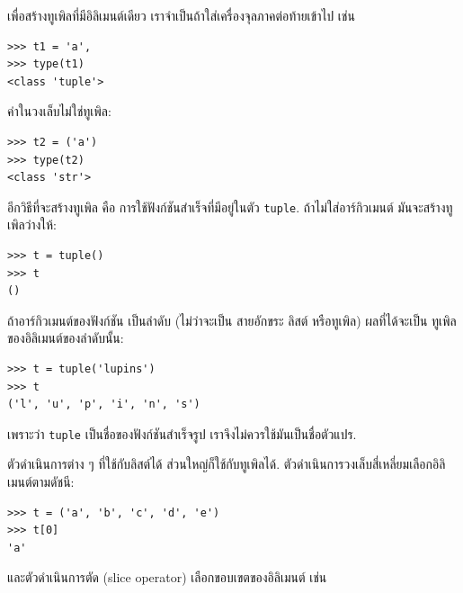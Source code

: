 เพื่อสร้างทูเพิลที่มีอิลิเมนต์เดียว เราจำเป็นถ้าใส่เครื่องจุลภาคต่อท้ายเข้าไป
เช่น

\begin{verbatim}
>>> t1 = 'a',
>>> type(t1)
<class 'tuple'>
\end{verbatim}
%
ค่าในวงเล็บไม่ใช่ทูเพิล:

\begin{verbatim}
>>> t2 = ('a')
>>> type(t2)
<class 'str'>
\end{verbatim}
%

อีกวิธีที่จะสร้างทูเพิล คือ การใช้ฟังก์ชันสำเร็จที่มีอยู่ในตัว \texttt{tuple}.
ถ้าไม่ใส่อาร์กิวเมนต์  มันจะสร้างทูเพิลว่างให้:

\begin{verbatim}
>>> t = tuple()
>>> t
()
\end{verbatim}
%

ถ้าอาร์กิวเมนต์ของฟังก์ชัน เป็นลำดับ (ไม่ว่าจะเป็น สายอักขระ ลิสต์ หรือทูเพิล)
ผลที่ได้จะเป็น ทูเพิลของอิลิเมนต์ของลำดับนั้น:

\begin{verbatim}
>>> t = tuple('lupins')
>>> t
('l', 'u', 'p', 'i', 'n', 's')
\end{verbatim}
%

เพราะว่า \texttt{tuple} เป็นชื่อของฟังก์ชันสำเร็จรูป
เราจึงไม่ควรใช้มันเป็นชื่อตัวแปร.


ตัวดำเนินการต่าง ๆ ที่ใช้กับลิสต์ได้ ส่วนใหญ่ก็ใช้กับทูเพิลได้.
ตัวดำเนินการวงเล็บสี่เหลี่ยมเลือกอิลิเมนต์ตามดัชนี:

\begin{verbatim}
>>> t = ('a', 'b', 'c', 'd', 'e')
>>> t[0]
'a'
\end{verbatim}
%
%
และตัวดำเนินการตัด (slice operator) เลือกขอบเขตของอิลิเมนต์ เช่น


